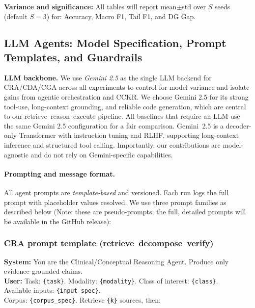 \documentclass{article}
\begin{document}
\textbf{Variance and significance:}
\label{app:variance}
All tables will report mean$\pm$std over $S$ seeds (default $S=3$) for:
Accuracy, Macro F1, Tail F1, and DG Gap.




\subsection{LLM Agents: Model Specification, Prompt Templates, and Guardrails}
\label{app:llm_details}

 \textbf{LLM backbone.} We use \textit{Gemini 2.5} as the single LLM backend for CRA/CDA/CGA across all experiments to control for model variance and isolate gains from agentic orchestration and CCKR.
We choose Gemini 2.5 for its strong tool-use, long-context grounding, and reliable code generation, which are central to our retrieve--reason--execute pipeline.
All baselines that require an LLM use the same Gemini 2.5 configuration for a fair comparison. Gemini~2.5 is a decoder-only Transformer with instruction tuning and RLHF, supporting long-context inference and structured tool calling. Importantly, our contributions are model-agnostic and do not rely on Gemini-specific capabilities.

\paragraph{Prompting and message format.}
All agent prompts are \emph{template-based} and versioned. Each run logs the full prompt with placeholder values resolved.
We use three prompt families as described below (Note: these are pseudo-prompts; the full, detailed prompts will be available in the GitHub release):

\subsubsection{CRA prompt template (retrieve--decompose--verify)}
\label{app:cra_prompt}

\noindent\textbf{System:} You are the Clinical/Conceptual Reasoning Agent. Produce only evidence-grounded claims.\\

\textbf{User:} Task: \texttt{\{task\}}. Modality: \texttt{\{modality\}}. Class of interest: \texttt{\{class\}}.\\
Available inputs: \texttt{\{input\_spec\}}.\\
Corpus: \texttt{\{corpus\_spec\}}. Retrieve \texttt{\{k\}} sources, then:
\end{document}
